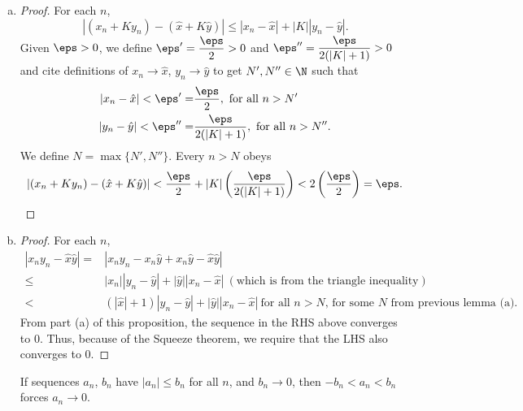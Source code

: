 \begin{enumerate}[(a)]
	\item 
	\begin{proof}
		For each \(n\), 
		\begin{equation*}
			|(x_n+Ky_n)-(\hat{x}+K\hat{y})|\leq |x_n-\hat{x}|+|K||y_n-\hat{y}|.
		\end{equation*}
		Given \(\eps>0\), we define \(\eps'=\displaystyle\frac{\eps}{2}>0\) and \(\eps''=\displaystyle\frac{\eps}{2(|K|+1)}>0\) and cite definitions of \(x_n\to\hat{x}\), \(y_n\to\hat{y}\) to get \(N',N''\in\N\) such that 
		\begin{align*}
			|x_n-\hat{x}|<\eps'=&\frac{\eps}{2},~\text{for all}~n>N'\\
			|y_n-\hat{y}|<\eps''=&\frac{\eps}{2(|K|+1)},~\text{for all}~n>N''.
		\end{align*}
		We define \(N=\operatorname{max}\{N',N''\}\). Every \(n>N\) obeys 
		\begin{equation*}
			|(x_n+Ky_n)-(\hat{x}+K\hat{y})|<\frac{\eps}{2}+|K|\left(\frac{\eps}{2(|K|+1)}\right)<2\left(\frac{\eps}{2}\right)=\eps.
		\end{equation*}
	\end{proof}
	
	\item 
	\begin{proof}
		For each \(n\), 
		\begin{align*}
			|x_ny_n-\hat{x}\hat{y}|=&|x_ny_n-x_n\hat{y}+x_n\hat{y}-\hat{x}\hat{y}|\\
			\leq&|x_n||y_n-\hat{y}|+|\hat{y}||x_n-\hat{x}|~(\text{which is from the triangle inequality})\\
			<&(|\hat{x}|+1)|y_n-\hat{y}|+|\hat{y}||x_n-\hat{x}|~\text{for all \(n>N\), for some \(N\) from previous lemma (a).}
		\end{align*}
		From part (a) of this proposition, the sequence in the RHS above converges to 0. Thus, because of the Squeeze theorem, we require that the LHS also converges to 0.
	\end{proof}
	\begin{note}
		If sequences \(a_n\), \(b_n\) have \(|a_n|\leq b_n\) for all \(n\), and \(b_n\to 0\), then \(-b_n<a_n<b_n\) forces \(a_n\to 0\).
	\end{note}
	

\end{enumerate}

